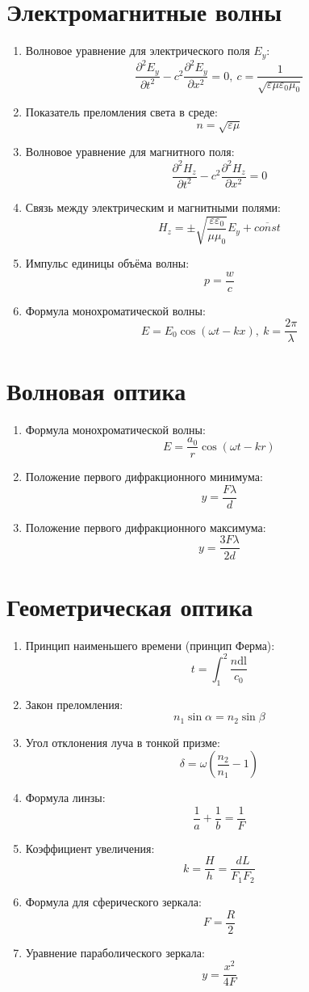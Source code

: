 	\section{Электромагнитные волны}
		\begin{enumerate}
			\item Волновое уравнение для электрического поля $E_y$: \[ \frac{\partial^2 E_y}{\partial t^2} - c^2 \frac{\partial^2 E_y}{\partial x^2} = 0, \ c = \frac{1}{\sqrt{\varepsilon \mu \varepsilon_0 \mu_0}} \]
			\item Показатель преломления света в среде: \[ n = \sqrt{\varepsilon \mu} \]
			\item Волновое уравнение для магнитного поля: \[ \frac{\partial^2 H_z}{\partial t^2} - c^2 \frac{\partial^2 H_z}{\partial x^2} = 0 \]
			\item Связь между электрическим и магнитными полями: \[ H_z = \pm \sqrt{\frac{\varepsilon \varepsilon_0}{\mu \mu_0}} E_y + \overline{const} \]
			\item Импульс единицы объёма волны: \[ p = \frac{w}{c} \]
			\item Формула монохроматической волны: \[ E = E_0 \cos(\omega t - kx), \ k = \frac{2 \pi}{\lambda} \]
		\end{enumerate}
	
	\section{Волновая оптика}
		\begin{enumerate}
			\item Формула монохроматической волны: \[ E = \frac{a_0}{r} \cos(\omega t - kr) \]
			\item Положение первого дифракционного минимума: \[ y = \frac{F \lambda}{d} \]
			\item Положение первого дифракционного максимума: \[ y = \frac{3F \lambda}{2d} \]
		\end{enumerate}
	
	\section{Геометрическая оптика}
		\begin{enumerate}
			\item Принцип наименьшего времени (принцип Ферма): \[ t = \int_{1}^{2} \frac{n \mathrm{dl}}{c_0} \]
			\item Закон преломления: \[ n_1 \sin{\alpha} = n_2 \sin{\beta} \]
			\item Угол отклонения луча в тонкой призме: \[ \delta = \omega \left( \frac{n_2}{n_1} - 1 \right) \]
			\item Формула линзы: \[ \frac{1}{a} + \frac{1}{b} = \frac{1}{F} \]
			\item Коэффициент увеличения: \[ k = \frac{H}{h} = \frac{dL}{F_1 F_2} \]
			\item Формула для сферического зеркала: \[ F = \frac{R}{2} \]
			\item Уравнение параболического зеркала: \[ y = \frac{x^2}{4F} \]
		\end{enumerate}
	
